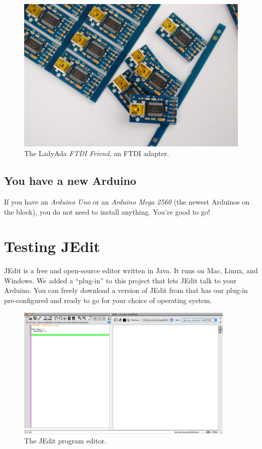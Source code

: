 \begin{figure}[ht]
  \begin{center}
    \includegraphics[width=0.8\linewidth]{ch0/images/20110115-ftdi-friend-print}
    \caption{The LadyAda {\em FTDI Friend}, an FTDI adapter.}
    \label{image:ftdi-friend}
  \end{center}
\end{figure}

\subsection{You have a new Arduino}
If you have an {\em Arduino Uno} or an {\em Arduino Mega 2560} (the newest Arduinos on the block), you do not need to install anything. You're good to go!

\section{Testing JEdit}
JEdit is a free and open-source editor written in Java. It runs on Mac, Linux, and Windows. We added a ``plug-in'' to this project that lets JEdit talk to your Arduino. You can freely download a version of JEdit from \ccc that has our plug-in pre-configured and ready to go for your choice of operating system.
      
\begin{figure}[!ht]
  \begin{center}
    \includegraphics[height=2.5in]{ch0/images/20100108-jedit-docked-occplug}
    \caption{The JEdit program editor.}
    \label{screenshot:jedit-occplug-docked}
  \end{center}
\end{figure}


